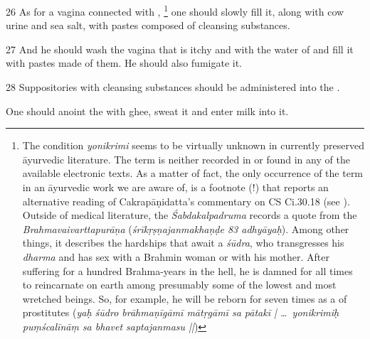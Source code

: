 \begin{translation}
\item [26]
As for a vagina connected with ,%
	\footnote{%
The condition \textit{yonikrimi} seems to be virtually unknown in currently 
preserved  āyurvedic literature. The term is neither recorded in 
\textcite{josi-maha} or found in any of the available electronic texts. As a matter 
of fact, the only occurrence of the term in an āyurvedic work we are aware of, is a 
footnote (!) that reports an alternative reading of Cakrapāṇidatta's commentary 
on CS Ci.30.18 (see \textcite[635b]{cara-trikamji3}).
Outside of medical literature, the \textit{Śabdakalpadruma} records a quote from 
the \textit{Brahmavaivarttapurāṇa} (\textit{śrīkṛṣṇajanmakhaṇḍe 83 adhyāyaḥ}). 
Among other things, it describes the hardships that await a \textit{śūdra}, who 
transgresses his \textit{dharma} and has sex with a Brahmin woman or with his 
mother. After suffering for a hundred Brahma-years in the hell, he is damned for 
all times to reincarnate on earth among presumably some of the lowest and most 
wretched beings. So, for example, he will be reborn for seven times as a 
 of prostitutes (\textit{yaḥ śūdro brāhmaṇīgāmī 
mātṛgāmī sa pātakī | \ldots\ yonikrimiḥ puṃścalīnāṃ sa bhavet saptajanmasu 
||})     
} 
one should slowly fill it, along with cow urine and sea salt, with pastes composed 
of cleansing substances.

\item [27]
And he should wash the vagina that is itchy and  with the water of  and fill it with pastes 
made of them. He should also fumigate it.
%
%


\item [28]
Suppositories with cleansing substances should be administered into the 
.

One should anoint the  with ghee, sweat it and enter milk 
into it. 


\end{translation}

